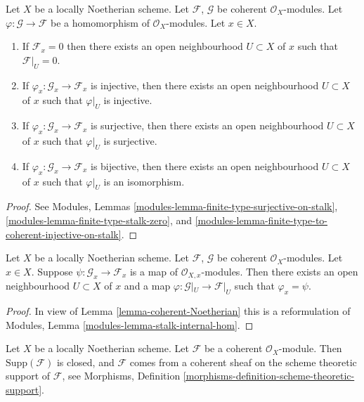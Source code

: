 \begin{lemma}
\label{lemma-local-isomorphism}
Let $X$ be a locally Noetherian scheme.
Let $\mathcal{F}$, $\mathcal{G}$ be coherent $\mathcal{O}_X$-modules.
Let $\varphi : \mathcal{G} \to \mathcal{F}$ be a homomorphism
of $\mathcal{O}_X$-modules. Let $x \in X$.
\begin{enumerate}
\item If $\mathcal{F}_x = 0$ then there exists an open neighbourhood
$U \subset X$ of $x$ such that $\mathcal{F}|_U = 0$.
\item If $\varphi_x : \mathcal{G}_x \to \mathcal{F}_x$ is injective,
then there exists an open neighbourhood $U \subset X$ of $x$ such that
$\varphi|_U$ is injective.
\item If $\varphi_x : \mathcal{G}_x \to \mathcal{F}_x$ is surjective,
then there exists an open neighbourhood $U \subset X$ of $x$ such that
$\varphi|_U$ is surjective.
\item If $\varphi_x : \mathcal{G}_x \to \mathcal{F}_x$ is bijective,
then there exists an open neighbourhood $U \subset X$ of $x$ such that
$\varphi|_U$ is an isomorphism.
\end{enumerate}
\end{lemma}

\begin{proof}
See Modules, Lemmas
\ref{modules-lemma-finite-type-surjective-on-stalk},
\ref{modules-lemma-finite-type-stalk-zero}, and
\ref{modules-lemma-finite-type-to-coherent-injective-on-stalk}.
\end{proof}

\begin{lemma}
\label{lemma-map-stalks-local-map}
Let $X$ be a locally Noetherian scheme.
Let $\mathcal{F}$, $\mathcal{G}$ be coherent $\mathcal{O}_X$-modules.
Let $x \in X$.
Suppose $\psi : \mathcal{G}_x \to \mathcal{F}_x$ is a map of
$\mathcal{O}_{X, x}$-modules.
Then there exists an open neighbourhood $U \subset X$ of $x$ and a map
$\varphi : \mathcal{G}|_U \to \mathcal{F}|_U$ such that
$\varphi_x = \psi$.
\end{lemma}

\begin{proof}
In view of Lemma \ref{lemma-coherent-Noetherian}
this is a reformulation of
Modules, Lemma \ref{modules-lemma-stalk-internal-hom}.
\end{proof}

\begin{lemma}
\label{lemma-coherent-support-closed}
Let $X$ be a locally Noetherian scheme. Let $\mathcal{F}$ be a coherent
$\mathcal{O}_X$-module. Then $\text{Supp}(\mathcal{F})$ is closed, and
$\mathcal{F}$ comes from a coherent sheaf on the scheme theoretic support
of $\mathcal{F}$, see
Morphisms, Definition \ref{morphisms-definition-scheme-theoretic-support}.
\end{lemma}

